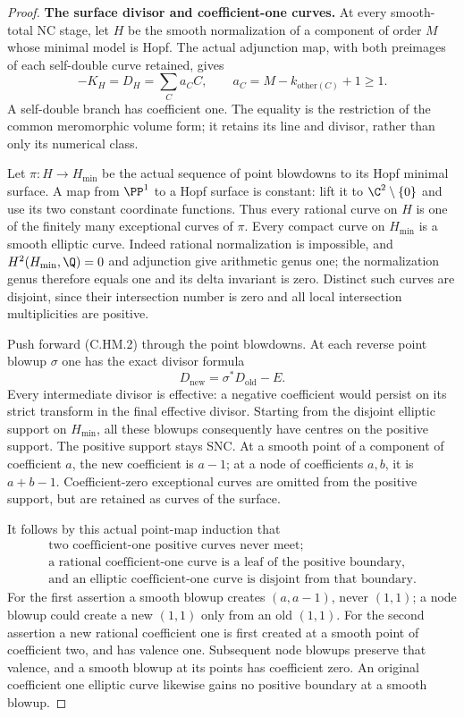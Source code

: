 \begin{proof}
\par\medskip\noindent\textbf{The surface divisor and coefficient-one curves.}
At every smooth-total NC stage, let \(H\) be the smooth
normalization of a component of order \(M\) whose minimal
model is Hopf.  The actual adjunction map, with both
preimages of each self-double curve retained, gives
\[
       -K_H=D_H=\sum_C a_C C,\qquad
       a_C=M-k_{\mathrm{other}(C)}+1\ge1 .
\tag{C.HM.2}
\]
A self-double branch has coefficient one.  The equality
is the restriction of the common meromorphic volume
form; it retains its line and divisor, rather than only
its numerical class.

Let \(\pi:H\to H_{\min}\) be the actual sequence of point
blowdowns to its Hopf minimal surface.  A map from
\(\PP^1\) to a Hopf surface is constant: lift it to
\(\C^2\setminus\{0\}\) and use its two constant coordinate
functions.  Thus every rational curve on \(H\) is one
of the finitely many exceptional curves of \(\pi\).
Every compact curve on \(H_{\min}\) is a smooth elliptic
curve.  Indeed rational normalization is impossible,
and \(H^2(H_{\min},\Q)=0\) and adjunction give arithmetic
genus one; the normalization genus therefore equals
one and its delta invariant is zero.  Distinct such
curves are disjoint, since their intersection number
is zero and all local intersection multiplicities are
positive.

Push forward (C.HM.2) through the point blowdowns.  At
each reverse point blowup \(\sigma\) one has the exact
divisor formula
\[
             D_{\mathrm{new}}=\sigma^*D_{\mathrm{old}}-E.
\tag{C.HM.3}
\]
Every intermediate divisor is effective: a negative
coefficient would persist on its strict transform in
the final effective divisor.  Starting from the
disjoint elliptic support on \(H_{\min}\), all these
blowups consequently have centres on the positive
support.  The positive support stays SNC.  At a smooth
point of a component of coefficient \(a\), the new
coefficient is \(a-1\); at a node of coefficients
\(a,b\), it is \(a+b-1\).  Coefficient-zero exceptional
curves are omitted from the positive support, but are
retained as curves of the surface.

It follows by this actual point-map induction that
\[
 \begin{gathered}
 \text{two coefficient-one positive curves never meet;}\\
 \text{a rational coefficient-one curve is a leaf
 of the positive boundary,}\\
 \text{and an elliptic coefficient-one curve is
 disjoint from that boundary.}
 \end{gathered}
\tag{C.HM.4}
\]
For the first assertion a smooth blowup creates
\((a,a-1)\), never \((1,1)\); a node blowup could
create a new \((1,1)\) only from an old \((1,1)\).
For the second assertion a new rational coefficient
one is first created at a smooth point of coefficient
two, and has valence one.  Subsequent node blowups
preserve that valence, and a smooth blowup at its
points has coefficient zero.  An original coefficient
one elliptic curve likewise gains no positive boundary
at a smooth blowup.


\end{proof}
